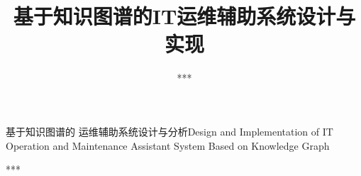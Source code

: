 \studentid{***}   %
\title{基于知识图谱的IT运维辅助系统设计与实现}{基于知识图谱的  运维辅助系统设计与分析}{}{}{Design and Implementation of IT Operation and Maintenance Assistant System Based on Knowledge Graph}{}
\author{***}{***}
\authorizedate{\today}
\committeechair{***}
\reviewer{***}{***}




